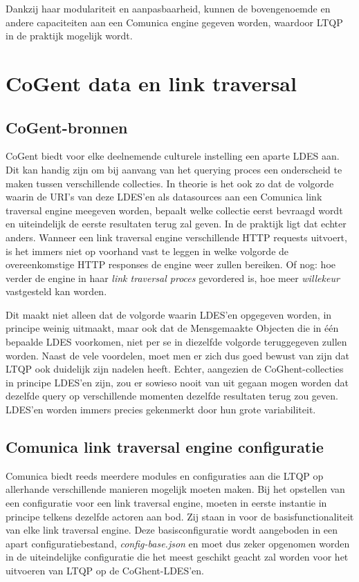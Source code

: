 \documentclass[conference]{IEEEtran}
\begin{document}
Dankzij haar modulariteit en aanpasbaarheid, kunnen de bovengenoemde en andere capaciteiten aan een Comunica engine gegeven worden, waardoor LTQP in de praktijk mogelijk wordt. \cite{taelman2018comunica} \cite{taelman2019lt}

\section{CoGent data en link traversal}

\subsection{CoGent-bronnen}
CoGent biedt voor elke deelnemende culturele instelling een aparte LDES aan. Dit kan handig zijn om bij aanvang van het querying proces een onderscheid te maken tussen verschillende collecties. In theorie is het ook zo dat de volgorde waarin de URI's van deze LDES'en als datasources aan een Comunica link traversal engine meegeven worden, bepaalt welke collectie eerst bevraagd wordt en uiteindelijk de eerste resultaten terug zal geven. In de praktijk ligt dat echter anders. Wanneer een link traversal engine verschillende HTTP requests uitvoert, is het immers niet op voorhand vast te leggen in welke volgorde de overeenkomstige HTTP responses de engine weer zullen bereiken. Of nog: hoe verder de engine in haar \textit{link traversal proces} gevordered is, hoe meer \textit{willekeur} vastgesteld kan worden.

Dit maakt niet alleen dat de volgorde waarin LDES'en opgegeven worden, in principe weinig uitmaakt, maar ook dat de Mensgemaakte Objecten die in één bepaalde LDES voorkomen, niet per se in diezelfde volgorde teruggegeven zullen worden. Naast de vele voordelen, moet men er zich dus goed bewust van zijn dat LTQP ook duidelijk zijn nadelen heeft. Echter, aangezien de CoGhent-collecties in principe LDES'en zijn, zou er sowieso nooit van uit gegaan mogen worden dat dezelfde query op verschillende momenten dezelfde resultaten terug zou geven. LDES'en worden immers precies gekenmerkt door hun grote variabiliteit.

\subsection{Comunica link traversal engine configuratie}
Comunica biedt reeds meerdere modules en configuraties aan die LTQP op allerhande verschillende manieren mogelijk moeten maken. Bij het opstellen van een configuratie voor een link traversal engine, moeten in eerste instantie in principe telkens dezelfde actoren aan bod. Zij staan in voor de basisfunctionaliteit van elke link traversal engine. Deze basisconfiguratie wordt aangeboden in een apart configuratiebestand, \textit{config-base.json} en moet dus zeker opgenomen worden in de uiteindelijke configuratie die het meest geschikt geacht zal worden voor het uitvoeren van LTQP op de CoGhent-LDES'en.
\end{document}
